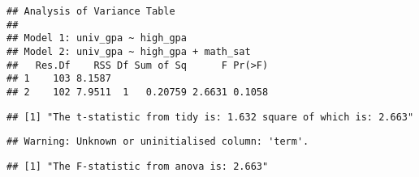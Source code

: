 \documentclass[]{article}
\newenvironment{Shaded}{\begin{snugshade}}{\end{snugshade}}
\newcommand{\CommentTok}[1]{\textcolor[rgb]{0.56,0.35,0.01}{\textit{#1}}}
\newcommand{\DataTypeTok}[1]{\textcolor[rgb]{0.13,0.29,0.53}{#1}}
\newcommand{\DecValTok}[1]{\textcolor[rgb]{0.00,0.00,0.81}{#1}}
\newcommand{\KeywordTok}[1]{\textcolor[rgb]{0.13,0.29,0.53}{\textbf{#1}}}
\newcommand{\NormalTok}[1]{#1}
\newcommand{\OperatorTok}[1]{\textcolor[rgb]{0.81,0.36,0.00}{\textbf{#1}}}
\newcommand{\StringTok}[1]{\textcolor[rgb]{0.31,0.60,0.02}{#1}}
\begin{document}
\begin{verbatim}
## Analysis of Variance Table
## 
## Model 1: univ_gpa ~ high_gpa
## Model 2: univ_gpa ~ high_gpa + math_sat
##   Res.Df    RSS Df Sum of Sq      F Pr(>F)
## 1    103 8.1587                           
## 2    102 7.9511  1   0.20759 2.6631 0.1058
\end{verbatim}

\begin{Shaded}
\end{Shaded}

\begin{verbatim}
## [1] "The t-statistic from tidy is: 1.632 square of which is: 2.663"
\end{verbatim}

\begin{Shaded}
\end{Shaded}

\begin{verbatim}
## Warning: Unknown or uninitialised column: 'term'.
\end{verbatim}

\begin{verbatim}
## [1] "The F-statistic from anova is: 2.663"
\end{verbatim}
\end{document}
